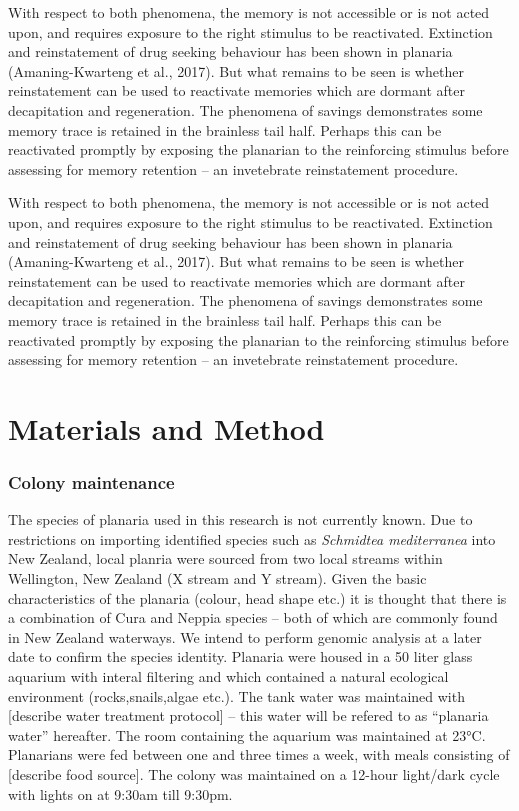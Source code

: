 \documentclass[
  letterpaper,
  DIV=11,
  numbers=noendperiod,
  oneside]{scrartcl}
\begin{document}
With respect to both phenomena, the memory is not accessible or is not
acted upon, and requires exposure to the right stimulus to be
reactivated. Extinction and reinstatement of drug seeking behaviour has
been shown in planaria (Amaning-Kwarteng et al., 2017). But what remains
to be seen is whether reinstatement can be used to reactivate memories
which are dormant after decapitation and regeneration. The phenomena of
savings demonstrates some memory trace is retained in the brainless tail
half. Perhaps this can be reactivated promptly by exposing the planarian
to the reinforcing stimulus before assessing for memory retention -- an
invetebrate reinstatement procedure.

With respect to both phenomena, the memory is not accessible or is not
acted upon, and requires exposure to the right stimulus to be
reactivated. Extinction and reinstatement of drug seeking behaviour has
been shown in planaria (Amaning-Kwarteng et al., 2017). But what remains
to be seen is whether reinstatement can be used to reactivate memories
which are dormant after decapitation and regeneration. The phenomena of
savings demonstrates some memory trace is retained in the brainless tail
half. Perhaps this can be reactivated promptly by exposing the planarian
to the reinforcing stimulus before assessing for memory retention -- an
invetebrate reinstatement procedure.

\section{Materials and Method}\label{materials-and-method}

\subsubsection{Colony maintenance}\label{colony-maintenance}

The species of planaria used in this research is not currently known.
Due to restrictions on importing identified species such as
\emph{Schmidtea mediterranea} into New Zealand, local planria were
sourced from two local streams within Wellington, New Zealand (X stream
and Y stream). Given the basic characteristics of the planaria (colour,
head shape etc.) it is thought that there is a combination of Cura and
Neppia species -- both of which are commonly found in New Zealand
waterways. We intend to perform genomic analysis at a later date to
confirm the species identity. Planaria were housed in a 50 liter glass
aquarium with interal filtering and which contained a natural ecological
environment (rocks,snails,algae etc.). The tank water was maintained
with {[}describe water treatment protocol{]} -- this water will be
refered to as ``planaria water'' hereafter. The room containing the
aquarium was maintained at 23°C. Planarians were fed between one and
three times a week, with meals consisting of {[}describe food source{]}.
The colony was maintained on a 12-hour light/dark cycle with lights on
at 9:30am till 9:30pm.
\end{document}

